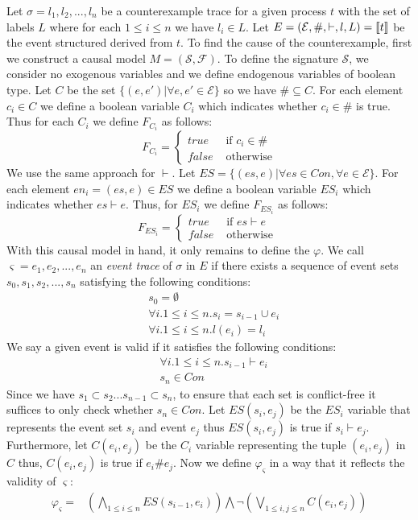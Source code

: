 \documentclass{article}
\begin{document}
Let $\sigma = l_1,l_2,...,l_n$ be a counterexample trace for a given process $t$
with the set of labels $L$ where for each $1 \leq i \leq n$ we have $l_i \in L$.
Let $E = (\mathcal{E},\#,\vdash,l,L) = \llbracket t \rrbracket$ 
be the event structured derived from $t$.
To find the cause of the counterexample, first we construct a causal model $M = (\mathcal{S},\mathcal{F})$.
To define the signature $\mathcal{S}$, we consider no exogenous variables and we 
define endogenous variables of boolean type. 
Let $C$ be the set $\{(e,e')| \forall e,e' \in \mathcal{E}\}$ so we have $\# \subseteq C$.
For each element $c_i \in C$ we define a boolean variable $C_i$ which indicates whether 
$c_i \in \#$ is true.
Thus for each $C_i$ we define $F_{C_i}$ as follows:
$$
    F_{C_i} = 
    \begin{cases}
    true & \text{ if } c_i \in \# \\
    false & \text{ otherwise}
    \end{cases}
$$
We use the same approach for $\vdash$.
Let $ES = \{ (es,e) | \forall es \in Con, \forall e \in \mathcal{E} \}$.
For each element $en_i = (es,e) \in ES$ we define a boolean variable $ES_i$
which indicates whether $es \vdash e$.
Thus, for $ES_i$ we define $F_{ES_i}$ as follows:
$$
    F_{ES_i} = 
    \begin{cases}
        true & \text{ if } es \vdash e \\
        false & \text{ otherwise }
    \end{cases}
$$
With this causal model in hand, it only remains to define the $\varphi$.
We call $\varsigma = e_1,e_2,...,e_n$ an \emph{event trace} of $\sigma$ in $E$ if 
there exists a sequence of event sets $s_0,s_1,s_2,...,s_n$ satisfying the following conditions:
\begin{align*}
    & s_0 = \emptyset  \\
    & \forall i. 1 \leq i \leq n. s_i = s_{i-1} \cup e_i \\
    & \forall i. 1 \leq i \leq n. l(e_i) = l_i
\end{align*}
We say a given event is valid if it satisfies the following conditions:
\begin{align*}
    & \forall i. 1 \leq i \leq n. s_{i-1} \vdash e_i \\
    & s_n \in Con 
\end{align*}
Since we have $s_1 \subset s_2 ... s_{n-1} \subset s_n$, to ensure that each set is conflict-free 
it suffices to only check whether $s_n \in Con$.
Let $ES(s_i,e_j)$ be the $ES_i$ variable that represents the event set $s_i$ and event $e_j$ thus
$ES(s_i,e_j)$ is true if $s_i \vdash e_j$.
Furthermore, let $C(e_i,e_j)$ be the $C_i$ variable representing the tuple $(e_i,e_j)$ in $C$ 
thus, $C(e_i,e_j)$ is true if $e_i\#e_j$.
Now we define $\varphi_{\varsigma}$ in a way that it reflects the validity of $\varsigma$:
\begin{align*}
        \varphi_{\varsigma} = & \left( \bigwedge_{1 \leq i \leq n}ES(s_{i-1},e_i) \right) \bigwedge \neg \left( \bigvee_{1\leq i,j \leq n}C(e_i,e_j)  \right)
\end{align*}
\end{document}
